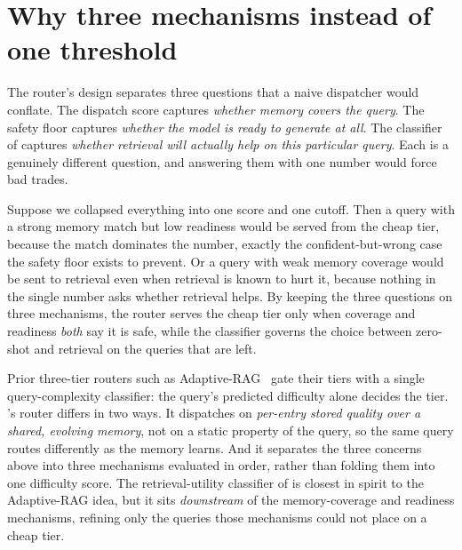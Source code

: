 \section{Why three mechanisms instead of one threshold}
\label{sec:router-three}

The router's design separates three questions that a naive dispatcher would conflate.
The dispatch score captures \emph{whether memory covers the query}. The safety floor
captures \emph{whether the model is ready to generate at all}. The classifier of
 captures \emph{whether retrieval will actually help on this particular
query}. Each is a genuinely different question, and answering them with one number
would force bad trades.

\begin{intuition}
Suppose we collapsed everything into one score and one cutoff. Then a query with a
strong memory match but low readiness would be served from the cheap tier, because the
match dominates the number, exactly the confident-but-wrong case the safety floor
exists to prevent. Or a query with weak memory coverage would be sent to retrieval even
when retrieval is known to hurt it, because nothing in the single number asks whether
retrieval helps. By keeping the three questions on three mechanisms, the router serves
the cheap tier only when coverage and readiness \emph{both} say it is safe, while the
classifier governs the choice between zero-shot and retrieval on the queries that are
left.
\end{intuition}

\begin{defence}
Prior three-tier routers such as Adaptive-RAG~\cite{jeong2024adaptive} gate their tiers
with a single query-complexity classifier: the query's predicted difficulty alone
decides the tier. \caem{}'s router differs in two ways. It dispatches on \emph{per-entry
stored quality over a shared, evolving memory}, not on a static property of the query,
so the same query routes differently as the memory learns. And it separates the three
concerns above into three mechanisms evaluated in order, rather than folding them into
one difficulty score. The retrieval-utility classifier of  is closest in
spirit to the Adaptive-RAG idea, but it sits \emph{downstream} of the memory-coverage
and readiness mechanisms, refining only the queries those mechanisms could not place on
a cheap tier.
\end{defence}

